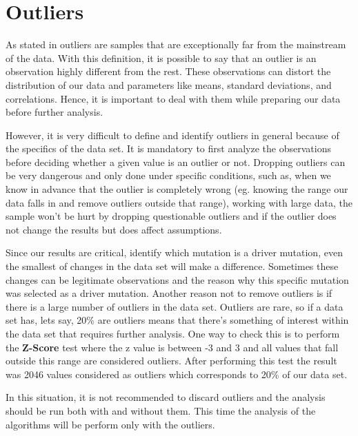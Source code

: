 \section{Outliers} %
\label{sec:outliners}
\hspace{10px} As stated in \cite{Kuhn} outliers are samples that are exceptionally far from the mainstream of the data. With this definition, it is possible to say that an outlier is an observation highly different from the rest. These observations can distort the distribution of our data and parameters like means, standard deviations, and correlations. Hence, it is important to deal with them while preparing our data before further analysis.

However, it is very difficult to define and identify outliers in general because of the specifics of the data set. It is mandatory to first analyze the observations before deciding whether a given value is an outlier or not. Dropping outliers can be very dangerous and only done under specific conditions, such as, when we know in advance that the outlier is completely wrong (eg. knowing the range our data falls in and remove outliers outside that range), working with large data, the sample won’t be hurt by dropping questionable outliers and if the outlier does not change the results but does affect assumptions. 

Since our results are critical, identify which mutation is a driver mutation, even the smallest of changes in the data set will make a difference. Sometimes these changes can be legitimate observations and the reason why this specific mutation was selected as a driver mutation. Another reason not to remove outliers is if there is a large number of outliers in the data set. Outliers are rare, so if a data set has, lets say, 20\% are outliers means that there's something of interest within the data set that requires further analysis. One way to check this is to perform the \textbf{Z-Score} test where the z value is between -3 and 3 and all values that fall outside this range are considered outliers. After performing this test the result was 2046 values considered as outliers
which corresponds to 20\% of our data set. 

In this situation, it is not recommended to discard outliers and the analysis should be run both with and without them. This time the analysis of the algorithms will be perform only with the outliers.

